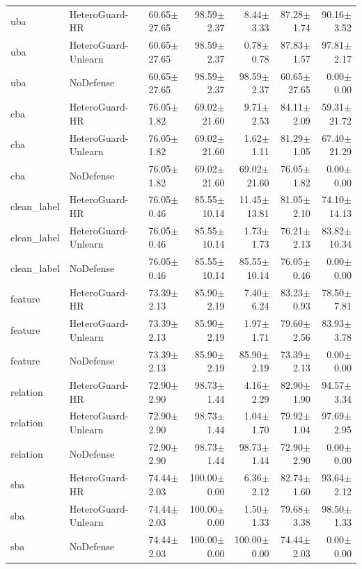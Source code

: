 \begin{table}[t]
\begin{tabular}{lllrrrr}
uba & HeteroGuard-HR & 60.65$\pm$27.65 & 98.59$\pm$2.37 & 8.44$\pm$3.33 & 87.28$\pm$1.74 & 90.16$\pm$3.52 \\
uba & HeteroGuard-Unlearn & 60.65$\pm$27.65 & 98.59$\pm$2.37 & 0.78$\pm$0.78 & 87.83$\pm$1.57 & 97.81$\pm$2.17 \\
uba & NoDefense & 60.65$\pm$27.65 & 98.59$\pm$2.37 & 98.59$\pm$2.37 & 60.65$\pm$27.65 & 0.00$\pm$0.00 \\
cba & HeteroGuard-HR & 76.05$\pm$1.82 & 69.02$\pm$21.60 & 9.71$\pm$2.53 & 84.11$\pm$2.09 & 59.31$\pm$21.72 \\
cba & HeteroGuard-Unlearn & 76.05$\pm$1.82 & 69.02$\pm$21.60 & 1.62$\pm$1.11 & 81.29$\pm$1.05 & 67.40$\pm$21.29 \\
cba & NoDefense & 76.05$\pm$1.82 & 69.02$\pm$21.60 & 69.02$\pm$21.60 & 76.05$\pm$1.82 & 0.00$\pm$0.00 \\
clean_label & HeteroGuard-HR & 76.05$\pm$0.46 & 85.55$\pm$10.14 & 11.45$\pm$13.81 & 81.05$\pm$2.10 & 74.10$\pm$14.13 \\
clean_label & HeteroGuard-Unlearn & 76.05$\pm$0.46 & 85.55$\pm$10.14 & 1.73$\pm$1.73 & 76.21$\pm$2.13 & 83.82$\pm$10.34 \\
clean_label & NoDefense & 76.05$\pm$0.46 & 85.55$\pm$10.14 & 85.55$\pm$10.14 & 76.05$\pm$0.46 & 0.00$\pm$0.00 \\
feature & HeteroGuard-HR & 73.39$\pm$2.13 & 85.90$\pm$2.19 & 7.40$\pm$6.24 & 83.23$\pm$0.93 & 78.50$\pm$7.81 \\
feature & HeteroGuard-Unlearn & 73.39$\pm$2.13 & 85.90$\pm$2.19 & 1.97$\pm$1.71 & 79.60$\pm$2.56 & 83.93$\pm$3.78 \\
feature & NoDefense & 73.39$\pm$2.13 & 85.90$\pm$2.19 & 85.90$\pm$2.19 & 73.39$\pm$2.13 & 0.00$\pm$0.00 \\
relation & HeteroGuard-HR & 72.90$\pm$2.90 & 98.73$\pm$1.44 & 4.16$\pm$2.29 & 82.90$\pm$1.90 & 94.57$\pm$3.34 \\
relation & HeteroGuard-Unlearn & 72.90$\pm$2.90 & 98.73$\pm$1.44 & 1.04$\pm$1.70 & 79.92$\pm$1.04 & 97.69$\pm$2.95 \\
relation & NoDefense & 72.90$\pm$2.90 & 98.73$\pm$1.44 & 98.73$\pm$1.44 & 72.90$\pm$2.90 & 0.00$\pm$0.00 \\
sba & HeteroGuard-HR & 74.44$\pm$2.03 & 100.00$\pm$0.00 & 6.36$\pm$2.12 & 82.74$\pm$1.60 & 93.64$\pm$2.12 \\
sba & HeteroGuard-Unlearn & 74.44$\pm$2.03 & 100.00$\pm$0.00 & 1.50$\pm$1.33 & 79.68$\pm$3.38 & 98.50$\pm$1.33 \\
sba & NoDefense & 74.44$\pm$2.03 & 100.00$\pm$0.00 & 100.00$\pm$0.00 & 74.44$\pm$2.03 & 0.00$\pm$0.00 \\

\end{tabular}
\end{table}
